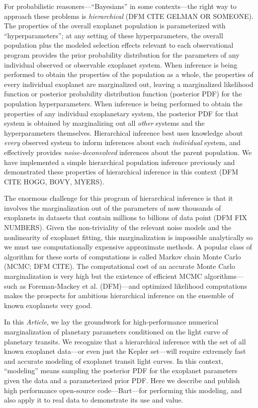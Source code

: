 \documentclass[12pt,preprint]{aastex}
\newcommand{\project}[1]{{\sffamily #1}}
\newcommand{\bart}{\project{Bart}}
\newcommand{\paper}{\emph{Article}}
\begin{document}
For probabilistic reasoners---``Bayesians'' in some contexts---the
right way to approach these problems is \emph{hierarchical} (DFM CITE
GELMAN OR SOMEONE).  The properties of the overall exoplanet
population is parameterized with ``hyperparameters''; at any setting
of these hyperparameters, the overall population plus the modeled
selection effects relevant to each observational program provides
the prior probability distribution for the parameters of any
individual observed or observable exoplanet system.  When inference is
being performed to obtain the properties of the population as a whole,
the properties of every individual exoplanet are marginalized out,
leaving a marginalized likelihood function or posterior probability
distribution function (posterior PDF) for the population
hyperparameters.  When inference is being performed to obtain the
properties of any individual exoplanetary system, the posterior PDF
for that system is obtained by marginalizing out all \emph{other}
systems and the hyperparameters themselves.  Hierarchical inference
best uses knowledge about \emph{every} observed system to inform
inferences about each \emph{individual} system, and effectively
provides \emph{noise-deconvolved} inferences about the parent
population.  We have implemented a simple hierarchical population
inference previously and demonstrated these properties of hierarchical
inference in this context (DFM CITE HOGG, BOVY, MYERS).

The enormous challenge for this program of hierarchical inference is
that it involves the marginalization out of the parameters of now
thousands of exoplanets in datasets that contain millions to billions
of data point (DFM FIX NUMBERS).  Given the non-triviality of the
relevant noise models and the nonlinearity of exoplanet fitting, this
marginalization is impossible analytically so we must use computationally
expensive approximate methods. A popular class of algorithm for these sorts
of computations is called Markov chain Monte Carlo (MCMC; DFM CITE).
The computational cost of an accurate Monte Carlo marginalization is very
high but the existence of efficient MCMC algorithms---such as Foreman-Mackey
et al. (DFM)---and optimized likelihood computations makes the prospects for
ambitious hierarchical inference on the ensemble of known exoplanets very
good.

In this \paper, we lay the groundwork for high-performance numerical
marginalization of planetary parameters conditioned on the light curve of
planetary transits. We recognize that a hierarchical inference
with the set of all known exoplanet data---or even just the
\project{Kepler} set---will require extremely fast and accurate modeling of
exoplanet transit light curves.  In this context, ``modeling'' means sampling
the posterior PDF for the exoplanet parameters given the data and a
parameterized prior PDF. Here we describe and publish high performance
open-source code---\bart---for performing this modeling, and also apply it to
real data to demonstrate its use and value.
\end{document}
